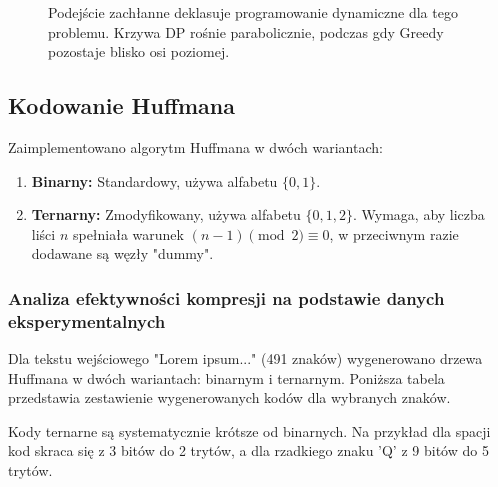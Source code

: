 \documentclass{article}
\begin{document}
	\begin{figure}[H]
		\centering
		\caption{Podejście zachłanne deklasuje programowanie dynamiczne dla tego problemu. Krzywa DP rośnie parabolicznie, podczas gdy Greedy pozostaje blisko osi poziomej.}
	\end{figure}
	
	\subsection{Kodowanie Huffmana}
	Zaimplementowano algorytm Huffmana w dwóch wariantach:
	\begin{enumerate}
		\item \textbf{Binarny:} Standardowy, używa alfabetu $\{0, 1\}$.
		\item \textbf{Ternarny:} Zmodyfikowany, używa alfabetu $\{0, 1, 2\}$. Wymaga, aby liczba liści $n$ spełniała warunek $(n-1) \pmod 2 \equiv 0$, w przeciwnym razie dodawane są węzły "dummy".
	\end{enumerate}
	
	\subsubsection{Analiza efektywności kompresji na podstawie danych eksperymentalnych}
	Dla tekstu wejściowego "Lorem ipsum..." (491 znaków) wygenerowano drzewa Huffmana w dwóch wariantach: binarnym i ternarnym. Poniższa tabela przedstawia zestawienie wygenerowanych kodów dla wybranych znaków. 
	
	Kody ternarne są systematycznie krótsze od binarnych. Na przykład dla spacji kod skraca się z 3 bitów do 2 trytów, a dla rzadkiego znaku 'Q' z 9 bitów do 5 trytów.
	
\end{document}
